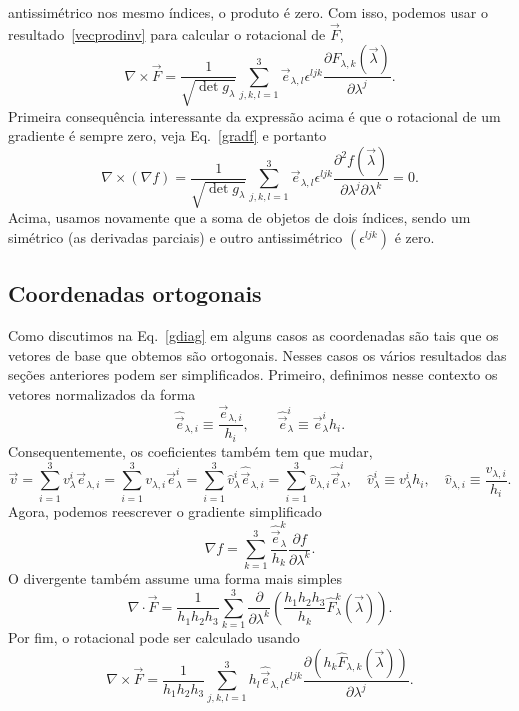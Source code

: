 antissimétrico nos mesmo índices, o produto é zero. Com isso, podemos usar o resultado~\eqref{vecprodinv} para calcular o rotacional de $\vec{F}$,
\begin{equation}
	\nabla\times\vec{F} = \frac{1}{\sqrt{\det g_\lambda}}\sum_{j,k,l=1}^3\vec{e}_{\lambda,l}\epsilon^{ljk}\frac{\partial F_{\lambda,k}(\vec{\lambda})}{\partial \lambda^j}.
\end{equation}
Primeira consequência interessante da expressão acima é que o rotacional de um
gradiente é sempre zero, veja Eq.~\eqref{gradf} e portanto
\begin{equation}
	\nabla\times(\nabla f) = \frac{1}{\sqrt{\det g_\lambda}}\sum_{j,k,l=1}^3\vec{e}_{\lambda,l}\epsilon^{ljk}\frac{\partial^2 f(\vec{\lambda})}{\partial \lambda^j\partial\lambda^k} = 0.
\end{equation}
Acima, usamos novamente que a soma de objetos de dois índices, sendo um
simétrico (as derivadas parciais) e outro antissimétrico
$\left(\epsilon^{ljk}\right)$ é zero.

\subsection{Coordenadas ortogonais}

Como discutimos na Eq.~\eqref{gdiag} em alguns casos as coordenadas são tais que
os vetores de base que obtemos são ortogonais. Nesses casos os vários resultados
das seções anteriores podem ser simplificados. Primeiro, definimos nesse
contexto os vetores normalizados da forma
\begin{equation}
	\hat{\vec{e}}_{\lambda,i} \equiv \frac{\vec{e}_{\lambda,i}}{h_i}, \qquad \hat{\vec{e}}_{\lambda}^i \equiv \vec{e}_{\lambda}^ih_i.
\end{equation}
Consequentemente, os coeficientes também tem que mudar,
\begin{equation}
	\vec{v} = \sum_{i=1}^3 v_\lambda^i\vec{e}_{\lambda,i} = \sum_{i=1}^3 v_{\lambda,i}\vec{e}_{\lambda}^i = \sum_{i=1}^3 \hat{v}_\lambda^i\hat{\vec{e}}_{\lambda,i} = \sum_{i=1}^3 \hat{v}_{\lambda,i}\hat{\vec{e}}_{\lambda}^i,\quad \hat{v}_\lambda^i \equiv v_\lambda^ih_i,\quad \hat{v}_{\lambda,i} \equiv \frac{v_{\lambda,i}}{h_i}.
\end{equation}
Agora, podemos reescrever o gradiente simplificado
\begin{equation}
	\nabla f = \sum_{k=1}^3\frac{\hat{\vec{e}}_\lambda^k}{h_k}\frac{\partial f}{\partial \lambda^k}.
\end{equation}
O divergente também assume uma forma mais simples
\begin{equation}
	\nabla\cdot\vec{F} = \frac{1}{h_1h_2h_3}\sum_{k=1}^3\frac{\partial }{\partial \lambda^k}\left(\frac{h_1h_2h_3}{h_k}\hat{F}_\lambda^k(\vec{\lambda})\right).
\end{equation}
Por fim, o rotacional pode ser calculado usando
\begin{equation}
	\nabla\times\vec{F} = \frac{1}{h_1h_2h_3}\sum_{j,k,l=1}^3h_l\hat{\vec{e}}_{\lambda,l}\epsilon^{ljk}\frac{\partial \left(h_k\hat{F}_{\lambda,k}(\vec{\lambda})\right)}{\partial \lambda^j}.
\end{equation}

